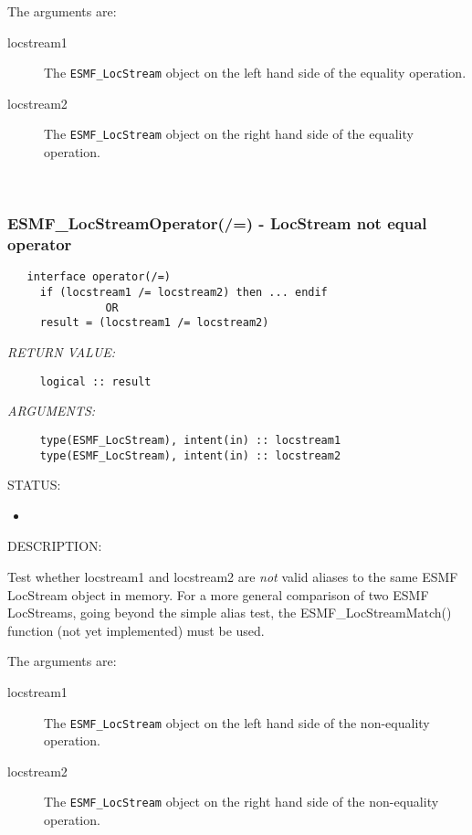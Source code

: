      The arguments are:
     \begin{description}
     \item[locstream1]
       The {\tt ESMF\_LocStream} object on the left hand side of the equality
       operation.
     \item[locstream2]
       The {\tt ESMF\_LocStream} object on the right hand side of the equality
       operation.
     \end{description}
   
 
\mbox{}\hrulefill\ 
 
\subsubsection [ESMF\_LocStreamOperator(/=)] {ESMF\_LocStreamOperator(/=) - LocStream not equal operator}


  
\begin{verbatim}   interface operator(/=)
     if (locstream1 /= locstream2) then ... endif
               OR
     result = (locstream1 /= locstream2)\end{verbatim}{\em RETURN VALUE:}
\begin{verbatim}     logical :: result\end{verbatim}{\em ARGUMENTS:}
\begin{verbatim}     type(ESMF_LocStream), intent(in) :: locstream1
     type(ESMF_LocStream), intent(in) :: locstream2\end{verbatim}
{\sf STATUS:}
   \begin{itemize}
   \item{}
   \end{itemize}
  
{\sf DESCRIPTION:\\ }


     Test whether locstream1 and locstream2 are {\it not} valid aliases to the
     same ESMF LocStream object in memory. For a more general comparison of two ESMF
     LocStreams, going beyond the simple alias test, the ESMF\_LocStreamMatch() function
     (not yet implemented) must be used.
  
     The arguments are:
     \begin{description}
     \item[locstream1]
       The {\tt ESMF\_LocStream} object on the left hand side of the non-equality
       operation.
     \item[locstream2]
       The {\tt ESMF\_LocStream} object on the right hand side of the non-equality
       operation.
     \end{description}
   
